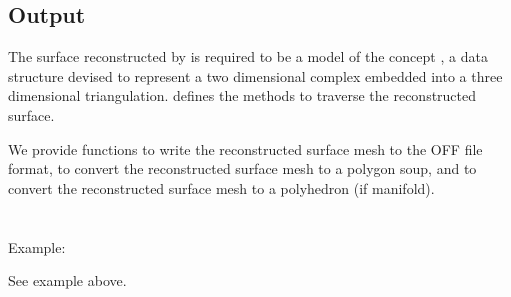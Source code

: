 \subsection{Output}

The surface reconstructed by  is required to be a model of the concept , a data structure devised to represent a two dimensional complex embedded into a three dimensional triangulation.  defines the methods to traverse the reconstructed surface.

We provide functions to write the reconstructed surface mesh to the OFF file format, to convert the reconstructed surface mesh to a polygon soup, and to convert the reconstructed surface mesh to a polyhedron (if manifold).
  \\
  \\
  \\

Example:

See  example above.